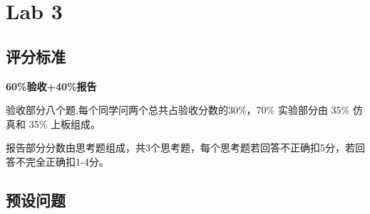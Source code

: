 \chapter{Lab 3}


\section{评分标准}
\textbf{60\%验收+40\%报告}

验收部分八个题,每个同学问两个总共占验收分数的30\%，70\% 实验部分由 35\% 仿真和 35\% 上板组成。

报告部分分数由思考题组成，共3个思考题，每个思考题若回答不正确扣5分，若回答不完全正确扣1-4分。


\section{预设问题}

